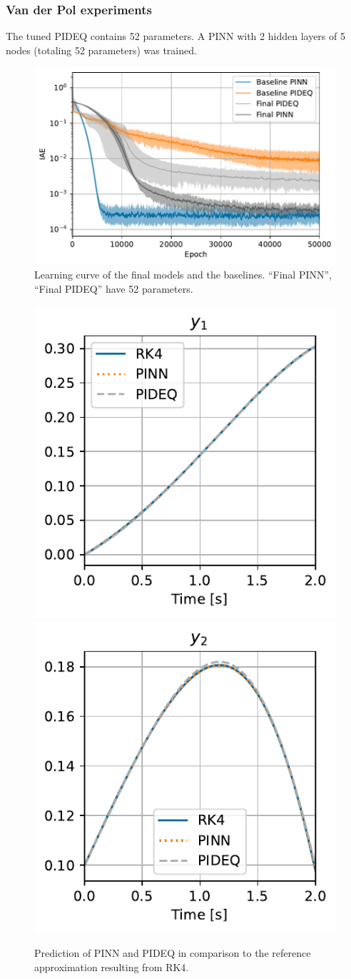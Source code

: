 \documentclass[t]{beamer}
\begin{document}
\begin{frame}
    \frametitle{Van der Pol experiments}
    The tuned PIDEQ contains 52 parameters. A PINN with 2 hidden layers of 5 nodes (totaling 52 parameters) was trained.
    \begin{figure}[h]
	\centering
	\includegraphics[width=.6\textwidth]{../images/final_iae.pdf}
	\caption{Learning curve of the final models and the baselines. ``Final PINN'', ``Final PIDEQ'' have 52 parameters.}
	\label{fig:final-iae}
    \end{figure}
\end{frame}

\begin{frame}
    \begin{figure}[h]
	\vspace{.1\textheight}
	\centering
	\includegraphics[width=.45\textwidth]{../images/final_vdp_y1.pdf}
	\includegraphics[width=.45\textwidth]{../images/final_vdp_y2.pdf}
	\caption{Prediction of PINN and PIDEQ in comparison to the reference approximation resulting from RK4.}
	\label{fig:final-vdp}
    \end{figure}
\end{frame}
\end{document}
